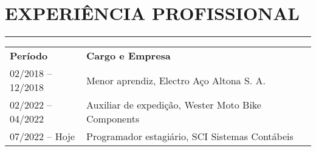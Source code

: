 \documentclass[11pt]{article}
\begin{document}
\vspace{1.0em}\section*{EXPERIÊNCIA PROFISSIONAL}
\hrule
\begin{flushleft}
\begin{tabular}{p{0.25\linewidth}p{0.8\linewidth}}
    \vspace{0.1em}\textbf{Período} & \vspace{0.1em}\textbf{Cargo e Empresa} \\
    02/2018 -- 12/2018 & Menor aprendiz, Electro Aço Altona S. A. \\
    02/2022 -- 04/2022 & Auxiliar de expedição, Wester Moto Bike Components \\
    07/2022 -- Hoje & Programador estagiário, SCI Sistemas Contábeis \\
\end{tabular}
\end{flushleft}
\end{document}
